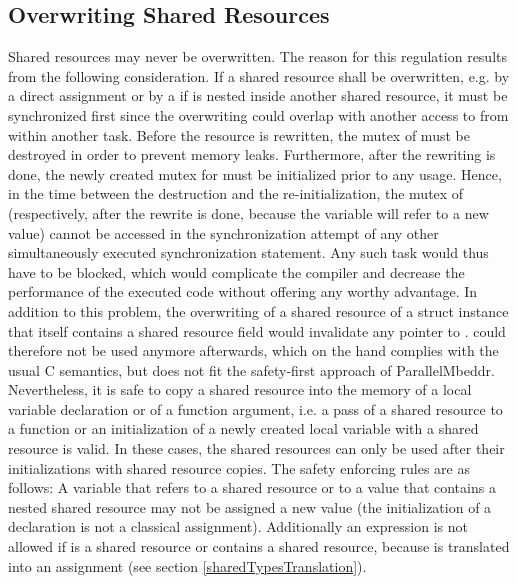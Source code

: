 \subsection{Overwriting Shared Resources}
\label{overwritingSharedResources}
Shared resources may never be overwritten. The reason for this regulation results from the following consideration. If a shared resource  shall be overwritten, e.g. by a direct assignment or by a  if  is nested inside another shared resource, it must be synchronized first since the overwriting could overlap with another access to  from within another task. Before the resource is rewritten, the mutex of  must be destroyed in order to prevent memory leaks. Furthermore, after the rewriting is done, the newly created mutex for  must be initialized prior to any usage. Hence, in the time between the destruction and the re-initialization, the mutex of  (respectively,  after the rewrite is done, because the variable will refer to a new value) cannot be accessed in the synchronization attempt of any other simultaneously executed synchronization statement. Any such task would thus have to be blocked, which would complicate the compiler and decrease the performance of the executed code without offering any worthy advantage. In addition to this problem, the overwriting of a shared resource of a struct instance that itself contains a shared resource field  would invalidate any pointer  to .  could therefore not be used anymore afterwards, which on the hand complies with the usual C semantics, but does not fit the safety-first approach of ParallelMbeddr.
Nevertheless, it is safe to copy a shared resource into the memory of a local variable declaration or of a function argument, i.e. a pass of a shared resource to a function or an initialization of a newly created local variable with a shared resource is valid. In these cases, the shared resources can only be used after their initializations with shared resource copies.
The safety enforcing rules are as follows: A variable that refers to a shared resource or to a value that contains a nested shared resource may not be assigned a new value (the initialization of a declaration is not a classical assignment). Additionally an expression  is not allowed if  is a shared resource or contains a shared resource, because  is translated into an assignment (see section \ref{sharedTypesTranslation}).

